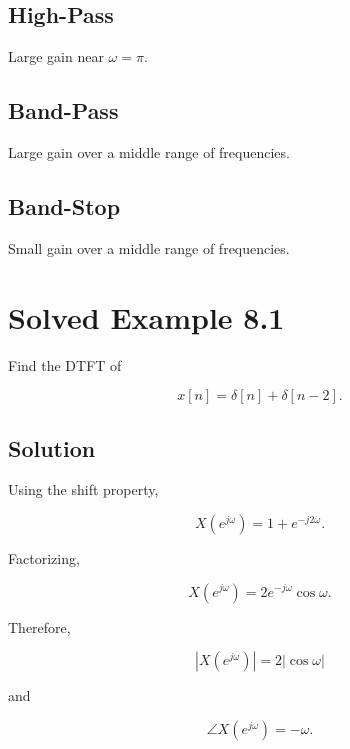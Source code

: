 
\subsection{High-Pass}

Large gain near \(\omega=\pi\).


\subsection{Band-Pass}

Large gain over a middle range of frequencies.


\subsection{Band-Stop}

Small gain over a middle range of frequencies.


\section{Solved Example 8.1}

Find the DTFT of

\[
x[n]=\delta[n]+\delta[n-2].
\]


\subsection{Solution}

Using the shift property,

\[
X(e^{j\omega})=
1+e^{-j2\omega}.
\]

Factorizing,

\[
X(e^{j\omega})=
2e^{-j\omega}\cos\omega.
\]

Therefore,

\[
\boxed{
|X(e^{j\omega})|=2|\cos\omega|
}
\]

and

\[
\boxed{
\angle X(e^{j\omega})=-\omega.
}
\]

